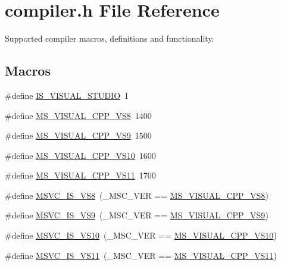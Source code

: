 \section{compiler.\-h File Reference}
\label{compiler_8h}


Supported compiler macros, definitions and functionality.  


\subsection*{Macros}
\begin{DoxyCompactItemize}
\item 
\#define \hyperlink{compiler_8h_a83066e93cc60e5e161e16a95080a41cd}{I\-S\-\_\-\-V\-I\-S\-U\-A\-L\-\_\-\-S\-T\-U\-D\-I\-O}~1
\item 
\#define \hyperlink{compiler_8h_a8d5296555daf8174a33c160b74544b83}{M\-S\-\_\-\-V\-I\-S\-U\-A\-L\-\_\-\-C\-P\-P\-\_\-\-V\-S8}~1400
\item 
\#define \hyperlink{compiler_8h_a3ab56482f6de80825bbeab1ac53c5c2b}{M\-S\-\_\-\-V\-I\-S\-U\-A\-L\-\_\-\-C\-P\-P\-\_\-\-V\-S9}~1500
\item 
\#define \hyperlink{compiler_8h_a963332af49ce1d9aa3728e52afb50f71}{M\-S\-\_\-\-V\-I\-S\-U\-A\-L\-\_\-\-C\-P\-P\-\_\-\-V\-S10}~1600
\item 
\#define \hyperlink{compiler_8h_a24c48fd4189f4008595d93e3df426a35}{M\-S\-\_\-\-V\-I\-S\-U\-A\-L\-\_\-\-C\-P\-P\-\_\-\-V\-S11}~1700
\item 
\#define \hyperlink{compiler_8h_a4396862b9c97b42748a1ca6cfda303f6}{M\-S\-V\-C\-\_\-\-I\-S\-\_\-\-V\-S8}~(\-\_\-\-M\-S\-C\-\_\-\-V\-E\-R == \hyperlink{compiler_8h_a8d5296555daf8174a33c160b74544b83}{M\-S\-\_\-\-V\-I\-S\-U\-A\-L\-\_\-\-C\-P\-P\-\_\-\-V\-S8})
\item 
\#define \hyperlink{compiler_8h_a23c12c9de144a2d49351371b72cb78f3}{M\-S\-V\-C\-\_\-\-I\-S\-\_\-\-V\-S9}~(\-\_\-\-M\-S\-C\-\_\-\-V\-E\-R == \hyperlink{compiler_8h_a3ab56482f6de80825bbeab1ac53c5c2b}{M\-S\-\_\-\-V\-I\-S\-U\-A\-L\-\_\-\-C\-P\-P\-\_\-\-V\-S9})
\item 
\#define \hyperlink{compiler_8h_ae4a092a868efb6f8dee93483eea71e2c}{M\-S\-V\-C\-\_\-\-I\-S\-\_\-\-V\-S10}~(\-\_\-\-M\-S\-C\-\_\-\-V\-E\-R == \hyperlink{compiler_8h_a963332af49ce1d9aa3728e52afb50f71}{M\-S\-\_\-\-V\-I\-S\-U\-A\-L\-\_\-\-C\-P\-P\-\_\-\-V\-S10})
\item 
\#define \hyperlink{compiler_8h_a70c2c6f6a445cfd4a9f4464023c84e76}{M\-S\-V\-C\-\_\-\-I\-S\-\_\-\-V\-S11}~(\-\_\-\-M\-S\-C\-\_\-\-V\-E\-R == \hyperlink{compiler_8h_a24c48fd4189f4008595d93e3df426a35}{M\-S\-\_\-\-V\-I\-S\-U\-A\-L\-\_\-\-C\-P\-P\-\_\-\-V\-S11})

\end{DoxyCompactItemize}
